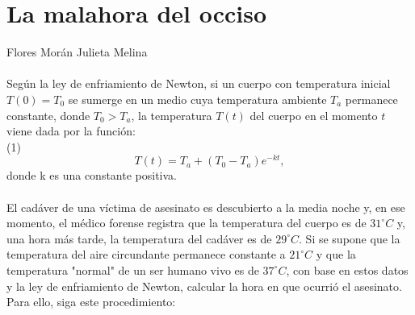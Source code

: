 \documentclass[12pt]{article}
\begin{document}
\section{La malahora del occiso}
Flores Morán Julieta Melina\\
\\
Según la ley de enfriamiento de Newton, si un cuerpo con temperatura inicial $T (0) = T_0$ se
sumerge en un medio cuya temperatura ambiente $T_a$ permanece constante, donde $T_0 > T_a$, la
temperatura $T(t)$ del cuerpo en el momento $t$ viene dada por la función: \\
(1)\\
\[
T(t)= T_a + (T_0-T_a)e^{-kt},
\]
donde k es una constante positiva.\\ \\
El cadáver de una víctima de asesinato es descubierto a la media noche y, en ese momento,
el médico forense registra que la temperatura del cuerpo es de $31  ^{\circ} C$ y, una hora más tarde, la temperatura del cadáver es de $29  ^{\circ} C $. 
Si se supone que la temperatura del aire circundante permanece constante a $21 ^{\circ}  C$ y que la temperatura "normal" de un ser humano vivo es de $37  ^{\circ} C$, con base en estos datos y la ley de enfriamiento de Newton, calcular la hora en que ocurrió el asesinato. Para ello, siga este procedimiento:
\end{document}
